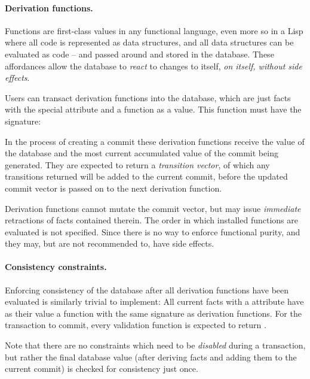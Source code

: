 \paragraph{Derivation functions.} Functions are first-class values in any functional language, even more so in a Lisp where all code is represented as data structures, and all data structures can be evaluated as code -- and passed around and stored in the database. These affordances allow the database to \emph{react} to changes to itself, \emph{on itself, without side effects}.

Users can transact derivation functions into the database, which are just facts with the special  attribute and a function as a value. This function must have the signature:

\begin{center}
  \lisp{($\lambda$ [db commit]))}
\end{center}

In the process of creating a commit these derivation functions receive the value of the database and the most current accumulated value of the commit being generated. They are expected to return a \emph{transition vector}, of which any transitions returned will be added to the current commit, before the updated commit vector is passed on to the next derivation function.

Derivation functions cannot mutate the commit vector, but may issue \emph{immediate} retractions of facts contained therein. The order in which installed functions are evaluated is not specified. Since there is no way to enforce functional purity, and they may, but are not recommended to, have side effects.

\paragraph{Consistency constraints.} Enforcing consistency of the database after all derivation functions have been evaluated is similarly trivial to implement: All current facts with a  attribute have as their value a function with the same signature as derivation functions. For the transaction to commit, every validation function is expected to return .

Note that there are no constraints which need to be \emph{disabled} during a transaction, but rather the final database value (after deriving facts and adding them to the current commit) is checked for consistency just once.


